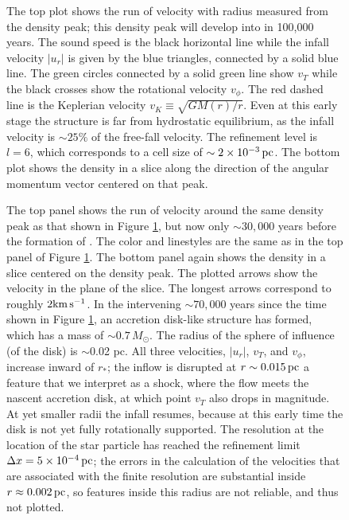 \documentclass[../dissertation.tex]{subfiles}
\begin{document}
\begin{figure}[htb] %
\caption[Hydro Sphere of Influence]{\label{fig:hydro_Sphere_of_influence_quad2_well_before}The top plot shows the run of velocity with radius measured from the density peak; 
this density peak will develop into \partA in 100,000 years.
The sound speed is the black horizontal line while the infall velocity 
$|u_r|$ is given by the blue triangles, connected by a solid blue line.
The green circles connected by a solid green line show 
$v_T$ while the black crosses show the rotational velocity $v_\phi$.
The red dashed line is the Keplerian velocity $v_K\equiv\sqrt{GM(r)/r}$.
Even at this early stage the structure is far from hydrostatic equilibrium, 
as the infall velocity is $\sim 25\%$ of the free-fall velocity.
The refinement level is $l = 6$, which corresponds to a cell size of $\sim2\times10^{-3}\,\rm pc$.
The bottom plot shows the density in a slice along the direction of the 
angular momentum vector centered on that peak.}
\end{figure}
%

%
\begin{figure}[htb] %
\caption[Hydro Sphere of Influence 2]{\label{fig:hydro_Sphere_influence_quad2_prior_to_particle}The top panel shows the run of velocity around the same density peak 
as that shown in Figure \ref{fig:hydro_Sphere_of_influence_quad2_well_before}, 
but now only $\sim 30,000$ years before the formation of \partA .
The color and linestyles are the same as in the top panel of Figure \ref{fig:hydro_Sphere_of_influence_quad2_well_before}.
The bottom panel again shows the density in a slice centered on the density peak.
The plotted arrows show the velocity in the plane of the slice.
The longest arrows correspond to roughly $2 {\rm km \, s^{-1}}$.
In the intervening $\sim 70,000$ years since the time shown in Figure \ref{fig:hydro_Sphere_of_influence_quad2_well_before}, an accretion disk-like structure has formed, which has a 
mass of $\sim 0.7 \, M_\odot$.
The radius of the sphere of influence (of the disk) is $\sim$0.02 pc. All three velocities, 
$|u_r|$, $v_T$, and $v_\phi$, increase inward of $r_*$; the inflow is 
disrupted at $r \sim0.015\,\rm pc$ a feature that we interpret as a shock, where 
the flow meets the nascent 
accretion disk, at which point $v_T$ also drops in magnitude. 
At yet smaller radii the infall resumes, because at this early time the disk is not 
yet fully rotationally supported. The resolution at the location of the star 
particle has reached the refinement limit $\Delta x=5\times10^{-4}\,\rm pc$; the 
errors in the calculation of the velocities that are associated with the 
finite resolution are substantial inside $r\approx 0.002\,\rm pc$, so features 
inside this radius are not reliable, and thus not plotted.}

\end{figure}
%
\end{document}

